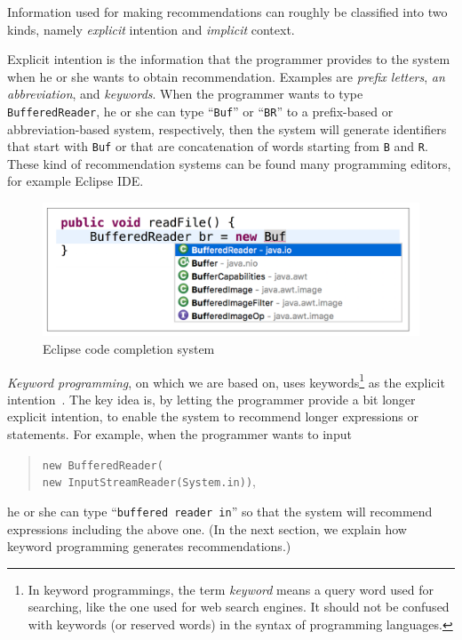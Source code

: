 \documentclass[PRO,english]{ipsj}
\begin{document}
Information used for making recommendations can roughly be classified into two kinds, namely \emph{explicit} intention and \emph{implicit} context.  

Explicit intention is the information that the programmer provides to the system when he or she wants to obtain recommendation.  Examples are \emph{prefix letters}, \emph{an abbreviation}, and \emph{keywords}.  When the programmer wants to type \texttt{BufferedReader}, he or she can type ``\texttt{Buf}'' or ``\texttt{BR}'' to a prefix-based or abbreviation-based system, respectively, then the system will generate identifiers that start with \texttt{Buf} or that are concatenation of words starting from \texttt{B} and \texttt{R}.  These kind of recommendation systems can be found many programming editors, for example Eclipse IDE.

\begin{figure}[!ht]
\centering
\includegraphics[scale=0.38]{Figure/Eclipse.pdf}
\caption{Eclipse code completion system}
\label{fig:Eclipse}
\end{figure}


\emph{Keyword programming}, on which we are based on,  uses keywords\footnote{In keyword programmings, the term \emph{keyword} means a query word used for searching, like the one used for web search engines.  It should not be confused with keywords (or reserved words) in the syntax of programming languages.} as the explicit intention~\cite{little2009keyword}.  The key idea is, by letting the programmer provide a bit longer explicit intention, to enable the system to recommend longer expressions or statements.  For example, when the programmer wants to input
\begin{quote}
  \texttt{new BufferedReader(\\
    \qquad{}new InputStreamReader(System.in))},   
\end{quote}
he or she can type ``\texttt{buffered reader in}'' so that the system will recommend expressions including the above one.  (In the next section, we explain how keyword programming generates recommendations.)
\end{document}
